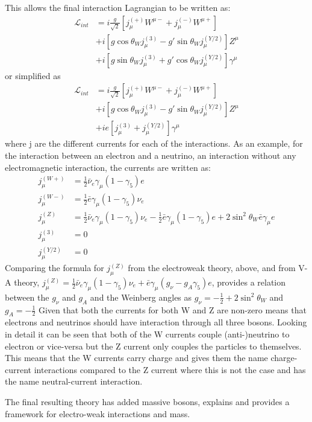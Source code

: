 This allows the final interaction Lagrangian to be written as:
\begin{align}
\mathcal{L}_{int}&=i\frac{g}{\sqrt{2}}[j_\mu^{(+)}W^{\mu-}+j_\mu^{(-)}W^{\mu+}]\\ \nonumber
&+i[g\cos\theta_Wj_\mu^{(3)}-g'\sin\theta_Wj_\mu^{(Y/2)}]Z^\mu\\ \nonumber
&+i[g\sin\theta_Wj_\mu^{(3)}+g'\cos\theta_Wj_\mu^{(Y/2)}]\gamma^\mu
\end{align}
or simplified as 
\begin{align}
\mathcal{L}_{int}&=i\frac{g}{\sqrt{2}}[j_\mu^{(+)}W^{\mu-}+j_\mu^{(-)}W^{\mu+}]\\ \nonumber
&+i[g\cos\theta_Wj_\mu^{(3)}-g'\sin\theta_Wj_\mu^{(Y/2)}]Z^\mu\\ \nonumber
&+ie[j_\mu^{(3)}+j_\mu^{(Y/2)}]\gamma^\mu
\end{align}
where j are the different currents for each of the interactions. As an example, for the interaction between an electron and a neutrino, an interaction without any electromagnetic interaction, the currents are written as:
\begin{align}
j_\mu^{(W+)}&=\frac{1}{2}\bar{\nu}_e\gamma_\mu(1-\gamma_5)e\\
j_\mu^{(W-)}&=\frac{1}{2}\bar{e}\gamma_\mu(1-\gamma_5)\nu_e\\
j_\mu^{(Z)}&=\frac{1}{2}\bar{\nu}_e\gamma_\mu(1-\gamma_5)\nu_e-\frac{1}{2}\bar{e}\gamma_\mu(1-\gamma_5)e+2\sin^2\theta_W\bar{e}\gamma_\mu e\\
j_\mu^{(3)}&=0\\
j_\mu^{(Y/2)}&=0
\end{align}
Comparing the formula for $j_\mu^{(Z)}$ from the electroweak theory, above, and from V-A theory, $j_\mu^{(Z)}=\frac{1}{2}\bar{\nu}_e\gamma_\mu(1-\gamma_5)\nu_e+\bar{e}\gamma_\mu(g_\nu-g_A\gamma_5)e$, provides a relation between the $g_\nu$ and $g_A$ and the Weinberg angles as $g_\nu=-\frac{1}{2}+2\sin^2\theta_W$ and $g_A = -\frac{1}{2}$ Given that both the currents for both W and Z are non-zero means that electrons and neutrinos should have interaction through all three bosons. Looking in detail it can be seen that both of the W currents couple (anti-)neutrino to electron or vice-versa but the Z current only couples the particles to themselves. This means that the W currents carry charge and gives them the name charge-current interactions compared to the Z current where this is not the case and has the name neutral-current interaction.

The final resulting theory has added massive bosons, explains and provides a framework for electro-weak interactions and mass.

